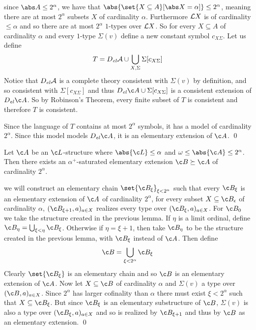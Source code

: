 \elemm

\Proof since $\abs A\leq2^\alpha$, we have that $\abs{\set{X\subseteq A}[\abs X=\alpha]}\leq2^\alpha$, meaning there are at most $2^\alpha$ subsets $X$ of cardinality $\alpha$.
Furthermore ${\cal L}X$ is of cardinality $\leq\alpha$ and so there are at most $2^\alpha$ $1$-types over ${\cal L}X$.
So for every $X\subseteq A$ of cardinality $\alpha$ and every $1$-type $\Sigma(v)$ define a new constant symbol $c_{X\Sigma}$.
Let us define
$$ T = D_{\it el}{\cal A}\cup\bigcup_{X,\Sigma}\Sigma[c_{X\Sigma}] $$
Notice that $D_{\it el}{\cal A}$ is a complete theory consistent with $\Sigma(v)$ by definition, and so consistent with $\Sigma[c_{X\Sigma}]$ and thus $D_{\it el}\c A\cup\Sigma[c_{X\Sigma}]$ is a consistent
extension of $D_{\it el}\c A$.
So by Robinson's Theorem, every finite subset of $T$ is consistent and therefore $T$ is consistent.

Since the language of $T$ contains at most $2^\alpha$ symbols, it has a model of cardinality $2^\alpha$.
Since this model models $D_{\it el}\c A$, it is an elementary extension of $\c A$.
\qed

\bthrm

    Let $\c A$ be an $\c L$-structure where $\abs{\c L}\leq\alpha$ and $\omega\leq\abs{\c A}\leq2^\alpha$.
    Then there exists an $\alpha^+$-saturated elementary extension $\c B\succeq\c A$ of cardinality $2^\alpha$.

\ethrm

\Proof we will construct an elementary chain $\set{\c B_\xi}_{\xi<2^\alpha}$ such that every $\c B_\xi$ is an elementary extension of $\c A$ of cardinality $2^\alpha$, for every subset
$X\subseteq\c B_\epsilon$ of cardinality $\alpha$, $(\c B_{\xi+1},a)_{a\in X}$ realizes every type over $(\c B_\xi,a)_{a\in X}$.
For $\c B_0$ we take the structure created in the previous lemma.
If $\eta$ is a limit ordinal, define $\c B_\eta=\bigcup_{\xi<\eta}\c B_\xi$.
Otherwise if $\eta=\xi+1$, then take $\c B_\eta$ to be the structure created in the previous lemma, with $\c B_\xi$ instead of $\c A$.
Then define
$$ \c B = \bigcup_{\xi<2^\alpha}\c B_\xi $$
Clearly $\set{\c B_\xi}$ is an elementary chain and so $\c B$ is an elementary extension of $\c A$.
Now let $X\subseteq\c B$ of cardinality $\alpha$ and $\Sigma(v)$ a type over $(\c B,a)_{a\in X}$.
Since $2^\alpha$ has larger cofinality than $\alpha$ there must exist $\xi<2^\alpha$ such that $X\subseteq\c B_\xi$.
But since $\c B_\xi$ is an elementary substructure of $\c B$, $\Sigma(v)$ is also a type over $(\c B_\xi,a)_{a\in X}$ and so is realized by $\c B_{\xi+1}$ and thus by $\c B$ as an elementary extension.
\qed

